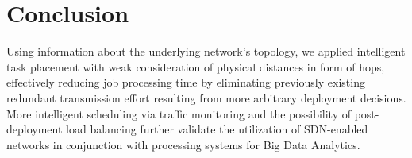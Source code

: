 \section{Conclusion}
Using information about the underlying network’s topology, we applied intelligent task placement
with weak consideration of physical distances in form of hops, effectively reducing job processing
time by eliminating previously existing redundant transmission effort resulting from more arbitrary
deployment decisions. More intelligent scheduling via traffic monitoring and the possibility of
post-deployment load balancing further validate the utilization of SDN-enabled networks in
conjunction with processing systems for Big Data Analytics.
